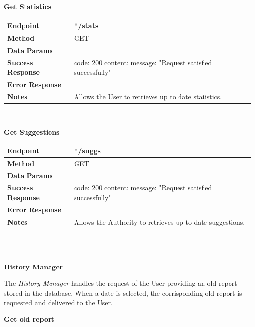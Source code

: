 \documentclass{report}
\begin{document}
\begin{center}{\textbf{Get Statistics}}\end{center}
    \begin{tabular}{| l | p{8cm} |}
        \hline
        \textbf{Endpoint} & */stats \\
        \hline
        \textbf{Method} & GET \\
        \hline
        \textbf{Data Params} & \\
        \hline
        \textbf{Success Response} &  code: 200 \newline content: {message: "Request satisfied successfully"}\\
        \hline
        \textbf{Error Response} & \\
        \hline
        \textbf{Notes} & Allows the User to retrieves up to date statistics. \\
        \hline
    \end{tabular}
\\
\begin{center}{\textbf{Get Suggestions}}\end{center}
    \begin{tabular}{| l | p{8cm} |}
        \hline
        \textbf{Endpoint} & */suggs \\
        \hline
        \textbf{Method} & GET \\
        \hline
        \textbf{Data Params} & \\
        \hline
        \textbf{Success Response} &  code: 200 \newline content: {message: "Request satisfied successfully"}\\
        \hline
        \textbf{Error Response} & \\
        \hline
        \textbf{Notes} & Allows the Authority to retrieves up to date suggestions. \\
        \hline
    \end{tabular}
\\\\
\begin{center}\large{\textbf{History Manager}}\end{center}
    The \textit{History Manager} handles the request of the User providing an old report stored in the database. When a date is selected, the corrisponding old report is requested and delivered to the User.
\begin{center}{\textbf{Get old report}}\end{center}
\end{document}
